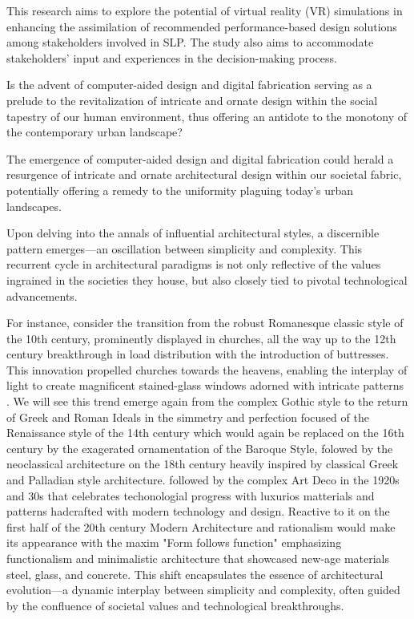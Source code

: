 This research aims to explore the potential of virtual reality (VR) simulations in enhancing the assimilation of recommended performance-based design solutions among stakeholders involved in SLP. The study also aims to accommodate stakeholders' input and experiences in the decision-making process.

Is the advent of computer-aided design and digital fabrication serving as a prelude to the revitalization of intricate and ornate design within the social tapestry of our human environment, thus offering an antidote to the monotony of the contemporary urban landscape?



The emergence of computer-aided design and digital fabrication could herald a resurgence of intricate and ornate architectural design within our societal fabric, potentially offering a remedy to the uniformity plaguing today's urban landscapes.

Upon delving into the annals of influential architectural styles, a discernible pattern emerges—an oscillation between simplicity and complexity. This recurrent cycle in architectural paradigms is not only reflective of the values ingrained in the societies they house, but also closely tied to pivotal technological advancements.

For instance, consider the transition from the robust Romanesque classic style of the 10th century, prominently displayed in churches\cite{Arora2023}, all the way up to the 12th century breakthrough in load distribution with the introduction of buttresses. This innovation propelled churches towards the heavens, enabling the interplay of light to create magnificent stained-glass windows adorned with intricate patterns \cite{Stacbond2020}.
We will see this trend emerge again from the complex Gothic style to the return of Greek and Roman Ideals in the simmetry and perfection focused of the Renaissance style of the 14th century which would again be replaced on the 16th century by the exagerated ornamentation of the Baroque Style, folowed by the neoclassical architecture on the 18th century heavily inspired by classical Greek and Palladian style architecture.
followed by the complex Art Deco in the 1920s and 30s that celebrates techonologial progress with luxurios matterials and patterns hadcrafted with modern technology and design.
Reactive to it on the first half of the 20th century Modern Architecture and rationalism would make its appearance with the maxim "Form follows function"\cite{Gage2015} emphasizing functionalism and minimalistic architecture that showcased new-age materials steel, glass, and concrete. \cite{Arora2023}
This shift encapsulates the essence of architectural evolution—a dynamic interplay between simplicity and complexity, often guided by the confluence of societal values and technological breakthroughs.

